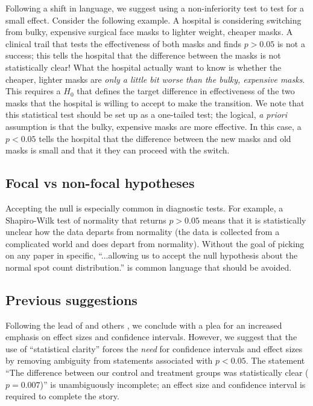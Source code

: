 Following a shift in language, we suggest using a non-inferiority test to test for a small effect.
Consider the following 
example.
A hospital is considering switching from bulky, expensive surgical face masks to lighter weight, cheaper masks.
A
clinical trail that tests the effectiveness of both masks and finds $p > 0.05$ is not a success; this tells the hospital 
that the difference between the masks is not statistically clear! What the hospital actually want to know is whether the 
cheaper, lighter masks are \emph{only a little bit worse than the bulky, expensive masks}.
This requires a $H_{0}$ that 
defines the target difference in effectiveness of the two masks that the hospital is willing to accept to make the 
transition.
We note that this statistical test should be set up as a one-tailed test; the logical, \emph{a priori} 
assumption is that the bulky, expensive masks are more effective.
In this case, a $p < 0.05$ tells the hospital that the 
difference between the new masks and old masks is small and that it they can proceed with the switch.

\subsection*{Focal vs non-focal hypotheses}

Accepting the null is especially common in diagnostic tests.
For example, a Shapiro-Wilk test of normality that
returns $p > 0.05$ means that it is statistically unclear how the data departs from normality (the data is collected
from a complicated world and does depart from normality).
Without the goal of picking on any paper in specific, 
``...allowing us to accept the null hypothesis about the normal spot count distribution.'' \citep{Karulinetal.2015} 
is common language that should be avoided.

\subsection*{Previous suggestions}

Following the lead of \citet{Cohen1994} and others \citep{Goodman1999, ZiliakandMcCloskey2008, WassersteinandLazar2016},
we conclude with a plea for an increased emphasis on effect sizes and confidence intervals.
However, we suggest that the
use of ``statistical clarity'' forces the \emph{need} for confidence intervals and effect sizes by removing ambiguity
from statements associated with $p < 0.05$. The statement ``The difference between our control and treatment groups was
statistically clear ($p = 0.007$)'' is unambiguously incomplete; an effect size and confidence interval 
is required to complete the story.

